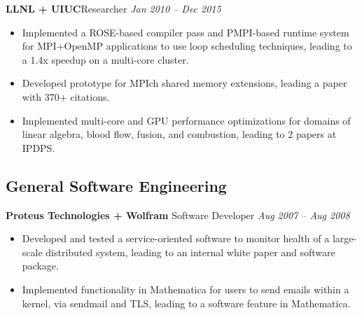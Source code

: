 \noindent
\textbf{LLNL + UIUC}\hfill Researcher \hfill \textit{Jan 2010 – Dec 2015}
\vspace*{-0.1in}
\begin{itemize}[itemsep=-0.1em]
\item Implemented a ROSE-based compiler pass and PMPI-based runtime system for MPI+OpenMP applications to use loop scheduling techniques, leading to a 1.4x speedup on a multi-core cluster. 
\item Developed prototype for MPIch shared memory extensions, leading a paper with 370+ citations.
\item Implemented multi-core and GPU performance optimizations for domains of linear algebra, blood flow, fusion, and combustion, leading to 2 papers at IPDPS.

\end{itemize}


\subsection*{General Software Engineering}

\noindent
\textbf{Proteus Technologies + Wolfram} \hfill {Software Developer} \hfill \textit{Aug 2007 – Aug 2008}
\vspace*{-0.1in}
\begin{itemize}[itemsep=-0.1em]
\item Developed and tested a service-oriented software to monitor health of a large-scale distributed system, leading to an internal white paper and software package. 
\item Implemented functionality in Mathematica for users to send emails within a kernel, via sendmail and TLS, leading to a software feature in Mathematica.

\end{itemize}
